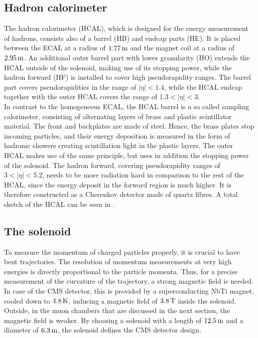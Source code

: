 \subsection{Hadron calorimeter}
The hadron calorimeter (HCAL), which is designed for the energy measurement of hadrons, consists also of a barrel (HB) and endcap parts (HE). It is placed between the ECAL at a radius of $1.77\,\text{m}$ and the magnet coil at a radius of $2.95\,\text{m}$. An additional outer barrel part with lower granularity (HO) extends the HCAL outside of the solenoid, making use of its stopping power, while the hadron forward (HF) is installed to cover high pseudorapidity ranges. The barrel part covers pseudorapidities in the range of $|\eta|<1.4$, while the HCAL endcap together with the outer HCAL covers the range of $1.3<|\eta|<3$.\\
In contrast to the homogeneous ECAL, the HCAL barrel is a so called sampling calorimeter, consisting of alternating layers of brass and plastic scintillator material. The front and backplates are made of steel. Hence, the brass plates stop incoming particles, and their energy deposition is measured in the form of hadronic showers creating scintillation light in the plastic layers. The outer HCAL makes use of the same principle, but uses in addition the stopping power of the solenoid. The hadron forward, covering pseudorapidity ranges of $3<|\eta|<5.2$, needs to be more radiation hard in comparison to the rest of the HCAL, since the energy deposit in the forward region is much higher. It is therefore constructed as a Cherenkov detector made of quartz fibres. A total sketch of the HCAL can be seen in .

\subsection{The solenoid}
To measure the momentum of charged particles properly, it is crucial to have bent trajectories. The resolution of momentum measurements at very high energies is directly proportional to the particle momenta. Thus, for a precise measurement of the curvature of the trajectory, a strong magnetic field is needed. In case of the CMS detector, this is provided by a superconducting NbTi magnet, cooled down to $4.8\,\text{K}$, inducing a magnetic field of $3.8\,\text{T}$ inside the solenoid. Outside, in the muon chambers that are discussed in the next section, the magnetic field is weaker. By choosing a solenoid with a length of $12.5\,\text{m}$ and a diameter of $6.3\,\text{m}$, the solenoid defines the CMS detector design.

